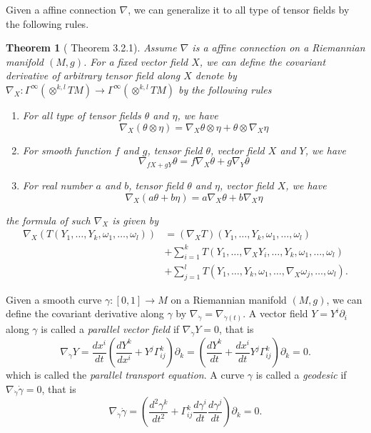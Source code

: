 \documentclass[12pt,a4paper,draft]{article}  %
\newcounter{cite}
\newtheorem{theorem}{Theorem}[section]
\theoremstyle{definition}
\numberwithin{equation}{section}
\begin{document}
Given a affine connection $\nabla$, we can generalize it to all type of tensor fields by the following rules. 
\begin{theorem}[\cite{Jost2017} Theorem 3.2.1]
        Assume $\nabla$ is a affine connection on a Riemannian manifold $(M,g)$. For a fixed vector field $X$, we can define the covariant derivative of arbitrary tensor field along $X$ denote by $\nabla_X: \Gamma^\infty(\otimes^{k,l} TM) \to \Gamma^\infty(\otimes^{k,l} TM)$ by the following rules
        \begin{enumerate}
                \item For all type of tensor fields $\theta$ and $\eta$, we have $$\nabla_X(\theta\otimes \eta) = \nabla_X \theta \otimes \eta + \theta \otimes \nabla_X \eta$$
                \item For smooth function $f$ and $g$, tensor field $\theta$, vector field $X$ and $Y$, we have $$\nabla_{fX+gY} \theta = f \nabla_X \theta + g \nabla_Y \theta$$
                \item For real number $a$ and $b$, tensor field $\theta$ and $\eta$, vector field $X$, we have $$\nabla_X (a\theta + b\eta) = a \nabla_X \theta + b \nabla_X \eta$$
        \end{enumerate}
        the formula of such $\nabla_X$ is given by
                \begin{equation*}
            \begin{aligned}
            \nabla_X\left(T(Y_1,\ldots,Y_k,\omega_1,\ldots,\omega_l)\right) &= (\nabla_X T)(Y_1,\ldots,Y_k,\omega_1,\ldots,\omega_l) \\
            &+ \sum_{i=1}^k T(Y_1,\ldots,\nabla_X Y_i,\ldots,Y_k,\omega_1,\ldots,\omega_l) \\
            &+ \sum_{j=1}^l T(Y_1,\ldots,Y_k,\omega_1,\ldots,\nabla_X \omega_j,\ldots,\omega_l).
        \end{aligned}
        \end{equation*}
\end{theorem}

Given a smooth curve $\gamma: [0,1] \to M$ on a Riemannian manifold $(M,g)$, we can define the covariant derivative along $\gamma$ by $\nabla_{\dot{\gamma}} = \nabla_{\dot{\gamma}(t)}$. A vector field $Y = Y^i\partial_i$ along $\gamma$ is called a \emph{parallel vector field} if $\nabla_{\dot{\gamma}} Y = 0$, that is
\begin{equation*}
    \nabla_{\dot{\gamma}} Y = \frac{d x^i}{dt} \left(\frac{d Y^k}{d x^i} + Y^j \Gamma_{ij}^k\right) \partial_k = \left(\frac{d Y^k}{dt} + \frac{d x^i}{dt} Y^j \Gamma_{ij}^k\right) \partial_k = 0.
\end{equation*}
which is called the \emph{parallel transport equation}. A curve $\gamma$ is called a \emph{geodesic} if $\nabla_{\dot{\gamma}} \dot{\gamma} = 0$, that is
\[
    \nabla_{\dot{\gamma}} \dot{\gamma} = \left(\frac{d^2 \gamma^k}{d t^2} + \Gamma_{ij}^k \frac{d \gamma^i}{d t} \frac{d \gamma^j}{d t}\right) \partial_k = 0.
\]
\end{document}
